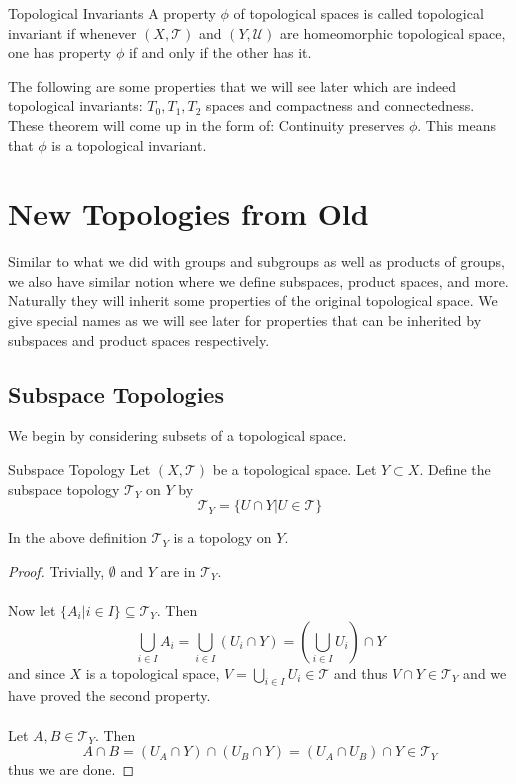\documentclass[a4paper]{article}
\begin{document}
\begin{defn}{Topological Invariants}{} A property $\phi$ of topological spaces is called topological invariant if whenever $(X,\mathcal{T})$ and $(Y,\mathcal{U})$ are homeomorphic topological space, one has property $\phi$ if and only if the other has it. 
\end{defn}

The following are some properties that we will see later which are indeed topological invariants: $T_0,T_1,T_2$ spaces and compactness and connectedness. These theorem will come up in the form of: Continuity preserves $\phi$. This means that $\phi$ is a topological invariant. 

\pagebreak
\section{New Topologies from Old}
Similar to what we did with groups and subgroups as well as products of groups, we also have similar notion where we define subspaces, product spaces, and more. Naturally they will inherit some properties of the original topological space. We give special names as we will see later for properties that can be inherited by subspaces and product spaces respectively. 
\subsection{Subspace Topologies}
We begin by considering subsets of a topological space. 
\begin{defn}{Subspace Topology}{} Let $(X,\mathcal{T})$ be a topological space. Let $Y\subset X$. Define the subspace topology $\mathcal{T}_Y$ on $Y$ by $$\mathcal{T}_Y=\{U\cap Y|U\in\mathcal{T}\}$$
\end{defn}

\begin{prp}{}{} In the above definition $\mathcal{T}_Y$ is a topology on $Y$. \tcbline
\begin{proof}
Trivially, $\emptyset$ and $Y$ are in $\mathcal{T}_Y$. \\~\\
Now let $\{A_i|i\in I\}\subseteq\mathcal{T}_Y$. Then $$\bigcup_{i\in I}A_i=\bigcup_{i\in I}(U_i\cap Y)=\left(\bigcup_{i\in I}U_i\right)\cap Y$$ and since $X$ is a topological space, $V=\bigcup_{i\in I}U_i\in\mathcal{T}$ and thus $V\cap Y\in\mathcal{T}_Y$ and we have proved the second property. \\~\\
Let $A,B\in\mathcal{T}_Y$. Then $$A\cap B=(U_A\cap Y)\cap(U_B\cap Y)=(U_A\cap U_B)\cap Y\in\mathcal{T}_Y$$ thus we are done. 
\end{proof}
\end{prp}
\end{document}
